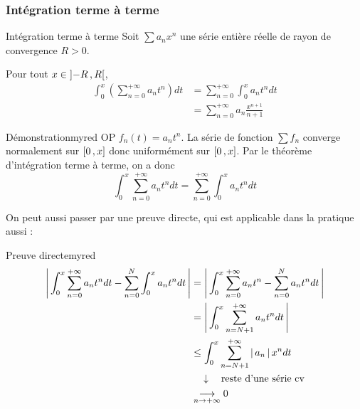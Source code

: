     \subsubsection{Intégration terme à terme}

    \begin{theo}{Intégration terme à terme}{}
        Soit $\sum a_n x^n$ une série entière \textcolor{myred}{réelle} de rayon de convergence $R > 0$. 

        Pour tout $x \in \left] -R \, , R \right[$,
        \begin{align*}
            \int_{0}^{x} \left(\sum_{n=0}^{+\infty} a_n t^n \right) dt 
            &= \sum_{n=0}^{+\infty} \int_{0}^{x} a_n t^n dt \\
            &= \sum_{n=0}^{+\infty} a_n \frac{x^{n+1}}{n+1}
        \end{align*}
    \end{theo}

    \begin{demo}{Démonstration}{myred}
        OP $f_n(t) = a_n t^n$. La série de fonction $\sum f_n$ converge normalement sur $\left[ 0 \, , x \right]$ donc uniformément sur $\left[ 0 \, , x \right]$. Par le théorème d’intégration terme à terme, on a donc 
        \[ \int_{0}^x \sum_{n=0}^{+\infty} a_n t^n dt = \sum_{n=0}^{+\infty} \int_{0}^{x} a_n t^n dt \]
    \end{demo}

    On peut aussi passer par une preuve directe, qui est applicable dans la pratique aussi :

    \begin{demo}{Preuve directe}{myred}
        \begin{align*}
            \left\lvert \,\int_{0}^{x} \sum_{n=0}^{+\infty} a_n t^n dt - \sum_{n=0}^{N} \int_{0}^{x} a_n t^n dt \, \right\rvert 
            &= \left\lvert \,\int_{0}^{x} \sum_{n=0}^{+\infty} a_n t^n - \sum_{n=0}^{N} a_n t^n dt \, \right\rvert \\
            &= \left\lvert \,\int_{0}^{x} \sum_{n=N+1}^{+\infty} a_n t^n dt \, \right\rvert \\
            &\leq \int_{0}^{x} \sum_{n=N+1}^{+\infty} \left\lvert \,a_n \, \right\rvert x^n dt \\
            & \quad \downarrow \quad \text{reste d’une série cv} \\
            &\underset{n \rightarrow +\infty}{\longrightarrow} 0
        \end{align*}
    \end{demo}

